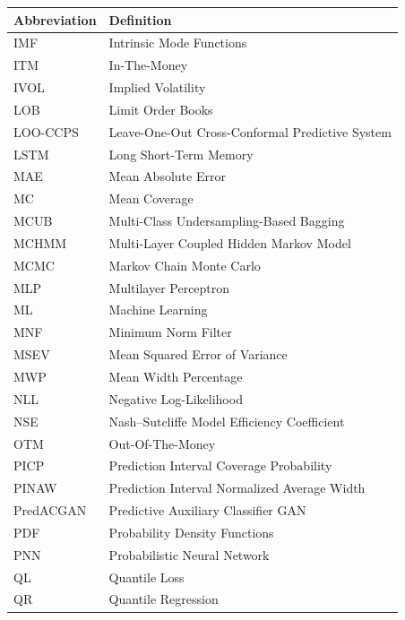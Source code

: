 \begin{table}[H]
\begin{subtable}[t]{0.49\textwidth}
\begin{tabular}{lp{}}
        
        \bottomrule
        \end{tabular}
    \end{subtable}
    \hfill
    \begin{subtable}[t]{0.49\textwidth}
        \centering
        \begin{tabular}{lp{}}
        \toprule
        \textbf{Abbreviation} & \textbf{Definition} \\
        \midrule
        IMF & Intrinsic Mode Functions \\
        ITM & In-The-Money \\
        IVOL & Implied Volatility \\
        LOB & Limit Order Books \\
        LOO-CCPS & Leave-One-Out Cross-Conformal Predictive System \\
        LSTM & Long Short-Term Memory \\
        MAE & Mean Absolute Error \\
        MC & Mean Coverage \\
        MCUB & Multi-Class Undersampling-Based Bagging \\
        MCHMM & Multi-Layer Coupled Hidden Markov Model \\
        MCMC & Markov Chain Monte Carlo \\
        MLP & Multilayer Perceptron \\
        ML & Machine Learning \\
        MNF & Minimum Norm Filter \\
        MSEV & Mean Squared Error of Variance \\
        MWP & Mean Width Percentage \\
        NLL & Negative Log-Likelihood \\
        NSE & Nash–Sutcliffe Model Efficiency Coefficient \\
        OTM & Out-Of-The-Money \\
        PICP & Prediction Interval Coverage Probability \\
        PINAW & Prediction Interval Normalized Average Width \\
        PredACGAN & Predictive Auxiliary Classifier GAN \\
        PDF & Probability Density Functions \\
        PNN & Probabilistic Neural Network \\
        QL & Quantile Loss \\
        QR & Quantile Regression \\

\end{tabular}
\end{subtable}
\end{table}

